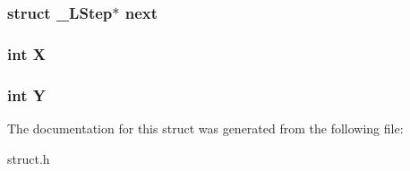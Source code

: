 \subsubsection[{\texorpdfstring{next}{next}}]{\setlength{\rightskip}{0pt plus 5cm}struct {\bf \+\_\+\+L\+Step}$\ast$ next}\hypertarget{struct___l_step_aec049652ca71b0108f37877e247b710c}{}\label{struct___l_step_aec049652ca71b0108f37877e247b710c}
\subsubsection[{\texorpdfstring{X}{X}}]{\setlength{\rightskip}{0pt plus 5cm}int X}\hypertarget{struct___l_step_a80c0944640e62d3ed6c5419c1bcc0c88}{}\label{struct___l_step_a80c0944640e62d3ed6c5419c1bcc0c88}
\subsubsection[{\texorpdfstring{Y}{Y}}]{\setlength{\rightskip}{0pt plus 5cm}int Y}\hypertarget{struct___l_step_aa482c4cc86a24474e4fb19b5b5978778}{}\label{struct___l_step_aa482c4cc86a24474e4fb19b5b5978778}


The documentation for this struct was generated from the following file\+:\begin{DoxyCompactItemize}
\item 
struct.\+h\end{DoxyCompactItemize}

